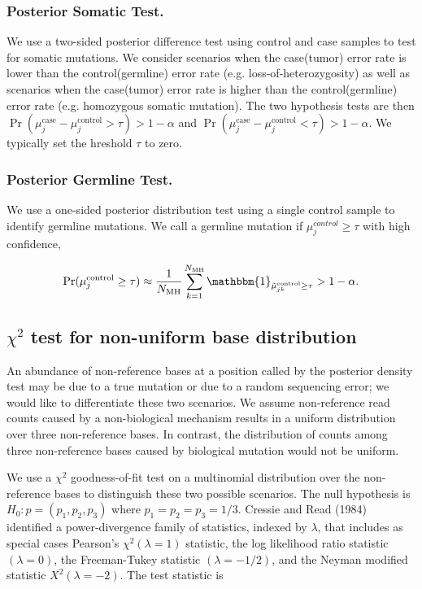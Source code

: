 \documentclass{bioinfo}
\begin{document}
\subsubsection*{Posterior Somatic Test.}

We use a two-sided posterior difference test using control and case samples to test for somatic mutations. We consider scenarios when the case(tumor) error rate is lower than the control(germline) error rate (e.g. loss-of-heterozygosity) as well as scenarios when the case(tumor) error rate is higher than the control(germline) error rate (e.g. homozygous somatic mutation). The two hypothesis tests are then $\Pr( \mu_j^{\text{case}} - \mu_j^{\text{control}} > \tau ) > 1-\alpha$ and $\Pr( \mu_j^{\text{case}} - \mu_j^{\text{control}} < \tau ) > 1-\alpha$. We typically set the hreshold $ \tau $ to zero.

\subsubsection*{Posterior Germline Test.}

We use a one-sided posterior distribution test using a single control sample to identify germline mutations. We call a germline mutation if $ \mu_j^{control} \geq \tau$ with high confidence,

\begin{equation}\label{eqn:germ_test}
	\Pr(\mu_j^{\text{control}}  \geq \tau ) \approx \frac{1}{N_{\text{MH}}} \sum_{k=1}^{N_{\text{MH}}} \mathbbm{1}_{\tilde{\mu}_{jk}^{\text{control}} \geq \tau } > 1-\alpha.
\end{equation}

\subsection{$\chi^2$ test for non-uniform base distribution}

An abundance of non-reference bases at a position called by the posterior density test may be due to a true mutation or due to a random sequencing error; we would like to differentiate these two scenarios. We assume non-reference read counts caused by a non-biological mechanism results in a uniform distribution over three non-reference bases. In contrast, the distribution of counts among three non-reference bases caused by biological mutation would not be uniform.

We use a $\chi^2$ goodness-of-fit test on a multinomial distribution over the non-reference bases to distinguish these two possible scenarios. The null hypothesis is $H_0: p = (p_1, p_2, p_3)$ where $p_1=p_2=p_3=1/3$. Cressie and Read (1984) identified a power-divergence family of statistics, indexed by $\lambda$, that includes as special cases Pearson's $\chi^2 (\lambda = 1)$ statistic, the log likelihood ratio statistic $(\lambda = 0)$, the Freeman-Tukey statistic $(\lambda = -1/2)$, and the Neyman modified statistic $X^2 (\lambda = -2)$. The test statistic is
\end{document}

